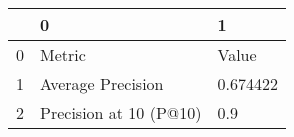 \begin{tabular}{lll}
\toprule
{} &                       0 &         1 \\
\midrule
0 &                  Metric &     Value \\
1 &       Average Precision &  0.674422 \\
2 &  Precision at 10 (P@10) &       0.9 \\
\bottomrule
\end{tabular}
